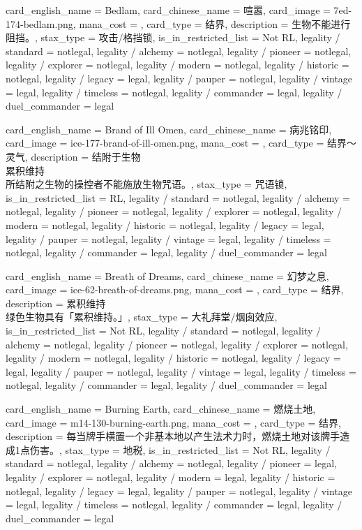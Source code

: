 \documentclass[lang = cn, color = black, 10pt]{AllThatStax}
\begin{document}
\card
{
	card_english_name = {Bedlam},
	card_chinese_name = {喧嚣},
	card_image = 7ed-174-bedlam.png,
	mana_cost = ,
	card_type = 结界,
	description = {生物不能进行阻挡。},
	stax_type = 攻击/格挡锁,
	is_in_restricted_list = Not RL,
	legality / standard = notlegal,
	legality / alchemy = notlegal,
	legality / pioneer = notlegal,
	legality / explorer = notlegal,
	legality / modern = notlegal,
	legality / historic = notlegal,
	legality / legacy = legal,
	legality / pauper = notlegal,
	legality / vintage = legal,
	legality / timeless = notlegal,
	legality / commander = legal,
	legality / duel_commander = legal
}

\card
{
	card_english_name = {Brand of Ill Omen},
	card_chinese_name = {病兆铭印},
	card_image = ice-177-brand-of-ill-omen.png,
	mana_cost = ,
	card_type = 结界～灵气,
	description = {结附于生物\\
累积维持\\
所结附之生物的操控者不能施放生物咒语。},
	stax_type = 咒语锁,
	is_in_restricted_list = RL,
	legality / standard = notlegal,
	legality / alchemy = notlegal,
	legality / pioneer = notlegal,
	legality / explorer = notlegal,
	legality / modern = notlegal,
	legality / historic = notlegal,
	legality / legacy = legal,
	legality / pauper = notlegal,
	legality / vintage = legal,
	legality / timeless = notlegal,
	legality / commander = legal,
	legality / duel_commander = legal
}

\card
{
	card_english_name = {Breath of Dreams},
	card_chinese_name = {幻梦之息},
	card_image = ice-62-breath-of-dreams.png,
	mana_cost = ,
	card_type = 结界,
	description = {累积维持\\
绿色生物具有「累积维持。」},
	stax_type = 大礼拜堂/烟囱效应,
	is_in_restricted_list = Not RL,
	legality / standard = notlegal,
	legality / alchemy = notlegal,
	legality / pioneer = notlegal,
	legality / explorer = notlegal,
	legality / modern = notlegal,
	legality / historic = notlegal,
	legality / legacy = legal,
	legality / pauper = notlegal,
	legality / vintage = legal,
	legality / timeless = notlegal,
	legality / commander = legal,
	legality / duel_commander = legal
}

\card
{
	card_english_name = {Burning Earth},
	card_chinese_name = {燃烧土地},
	card_image = m14-130-burning-earth.png,
	mana_cost = ,
	card_type = 结界,
	description = {每当牌手横置一个非基本地以产生法术力时，燃烧土地对该牌手造成1点伤害。},
	stax_type = 地税,
	is_in_restricted_list = Not RL,
	legality / standard = notlegal,
	legality / alchemy = notlegal,
	legality / pioneer = legal,
	legality / explorer = notlegal,
	legality / modern = legal,
	legality / historic = notlegal,
	legality / legacy = legal,
	legality / pauper = notlegal,
	legality / vintage = legal,
	legality / timeless = notlegal,
	legality / commander = legal,
	legality / duel_commander = legal
}
\end{document}
